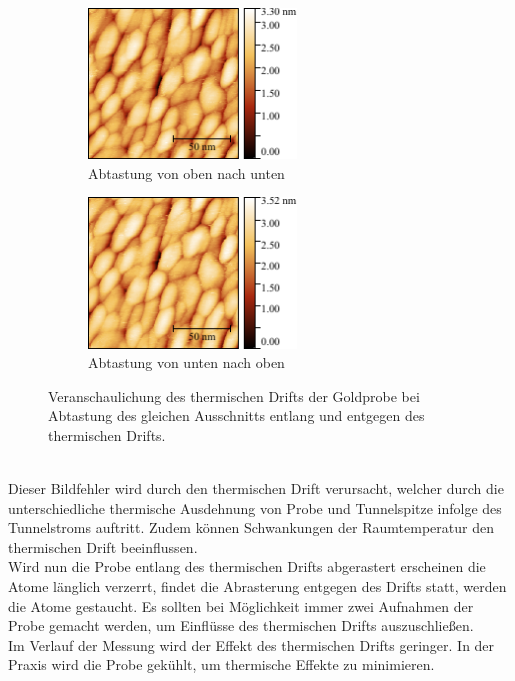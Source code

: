 \documentclass[a4paper,twoside,final]{article}
\begin{document}
\begin{figure}[htp]
    \centering
    \begin{subfigure}{0.45\textwidth}
        \includegraphics[height=4cm]{Bilder/Image01966_Drift_obenunten.pdf}
        \caption{Abtastung von oben nach unten}
    \end{subfigure}
    \hspace{0.5cm}
    \begin{subfigure}{0.45\textwidth}
        \includegraphics[height=4cm]{Bilder/Image01965_Drift_untenoben.pdf}
        \caption{Abtastung von unten nach oben}
    \end{subfigure}
    \caption{Veranschaulichung des thermischen Drifts der Goldprobe bei Abtastung des gleichen Ausschnitts entlang und entgegen des thermischen Drifts.}
    \label{fig:ThermischerDrift}
\end{figure}\\
Dieser Bildfehler wird durch den thermischen Drift verursacht, welcher durch die unterschiedliche thermische Ausdehnung von Probe und Tunnelspitze infolge des Tunnelstroms auftritt. Zudem können Schwankungen der Raumtemperatur den thermischen Drift beeinflussen.\\
Wird nun die Probe entlang des thermischen Drifts abgerastert erscheinen die Atome länglich verzerrt, findet die Abrasterung entgegen des Drifts statt, werden die Atome gestaucht. Es sollten bei Möglichkeit immer zwei Aufnahmen der Probe gemacht werden, um Einflüsse des thermischen Drifts auszuschließen.\\
Im Verlauf der Messung wird der Effekt des thermischen Drifts geringer. In der Praxis wird die Probe gekühlt, um thermische Effekte zu minimieren.
\end{document}
